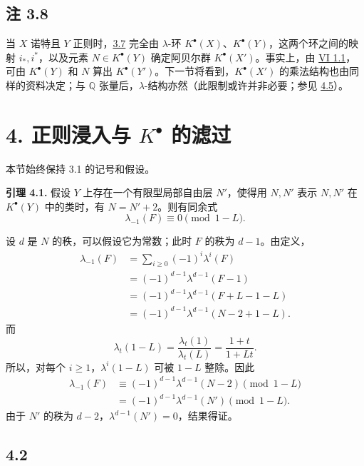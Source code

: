 \subsection*{注 3.8}

当 \(X\) 诺特且 \(Y\) 正则时，\hyperlink{sga6.e07.thm.3-7}{3.7} 完全由 \(\lambda\)-环 \(K^\bullet(X)\)、\(K^\bullet(Y)\)，这两个环之间的映射 \(i_*,i^*\)，以及元素 \(N\in K^\bullet(Y)\) 确定阿贝尔群 \(K^\bullet(X')\)。事实上，由 \hyperlink{sga6.e06.thm.1-1}{VI 1.1}，可由 \(K^\bullet(Y)\) 和 \(N\) 算出 \(K^\bullet(Y')\)。下一节将看到，\(K^\bullet(X')\) 的乘法结构也由同样的资料决定；与 \(\mathbb Q\) 张量后，\(\lambda\)-结构亦然（此限制或许并非必要；参见 \hyperlink{sga6.e07.rem.4-5}{4.5}）。

\section*{4. 正则浸入与 \(K^\bullet\) 的滤过}

本节始终保持 3.1 的记号和假设。

\textbf{引理 4.1.} 假设 \(Y\) 上存在一个有限型局部自由层 \(N'\)，使得用 \(N,N'\) 表示 \(N,N'\) 在 \(K^\bullet(Y)\) 中的类时，有 \(N=N'+2\)。则有同余式
\[
  \lambda_{-1}(F)\equiv 0 \pmod{1-L}.
\]

设 \(d\) 是 \(N\) 的秩，可以假设它为常数；此时 \(F\) 的秩为 \(d-1\)。由定义，
\[
\begin{aligned}
\lambda_{-1}(F)
 &= \sum_{i\ge0}(-1)^i\lambda^i(F)\\
 &= (-1)^{d-1}\lambda^{d-1}(F-1)\\
 &= (-1)^{d-1}\lambda^{d-1}(F+L-1-L)\\
 &= (-1)^{d-1}\lambda^{d-1}(N-2+1-L).
\end{aligned}
\]
而
\[
  \lambda_t(1-L)=\frac{\lambda_t(1)}{\lambda_t(L)}
  =\frac{1+t}{1+Lt}.
\]
所以，对每个 \(i\ge1\)，\(\lambda^i(1-L)\) 可被 \(1-L\) 整除。因此
\[
\begin{aligned}
\lambda_{-1}(F)
  &\equiv (-1)^{d-1}\lambda^{d-1}(N-2) \pmod{1-L}\\
  &=(-1)^{d-1}\lambda^{d-1}(N') \pmod{1-L}.
\end{aligned}
\]
由于 \(N'\) 的秩为 \(d-2\)，\(\lambda^{d-1}(N')=0\)，结果得证。

\subsection*{4.2}

